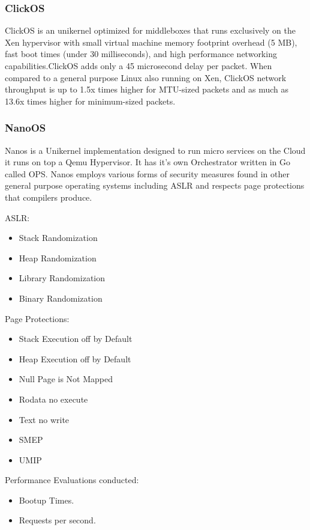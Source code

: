 \subsubsection{ClickOS}
ClickOS is an unikernel optimized for middleboxes that runs exclusively on
the Xen hypervisor with small virtual machine memory footprint overhead
(5 MB), fast boot times (under 30 milliseconds), and high performance
networking capabilities.ClickOS adds only a 45 microsecond delay per
packet. When compared to a general purpose Linux also running on Xen,
ClickOS network throughput is up to 1.5x times higher for MTU-sized packets
and as much as 13.6x times higher for minimum-sized packets. 

\subsubsection{NanoOS}
Nanos is a Unikernel implementation designed to run micro services on the 
Cloud it runs on top a Qemu Hypervisor. It has it's own Orchestrator 
written in Go called OPS. 
Nanos employs various forms of security measures found in other general purpose operating systems including ASLR and respects page protections 
that compilers produce.

ASLR:

\begin{itemize}
  \item Stack Randomization
  \item Heap Randomization
  \item Library Randomization
  \item Binary Randomization
\end{itemize}

Page Protections:

\begin{itemize}
  \item Stack Execution off by Default
  \item Heap Execution off by Default
  \item Null Page is Not Mapped
  \item Rodata no execute
  \item Text no write
\end{itemize}

\begin{itemize}
  \item SMEP
  \item UMIP
\end{itemize}

Performance Evaluations conducted:
\begin{itemize}
  \item Bootup Times.
  \item Requests per second.
\end{itemize}

